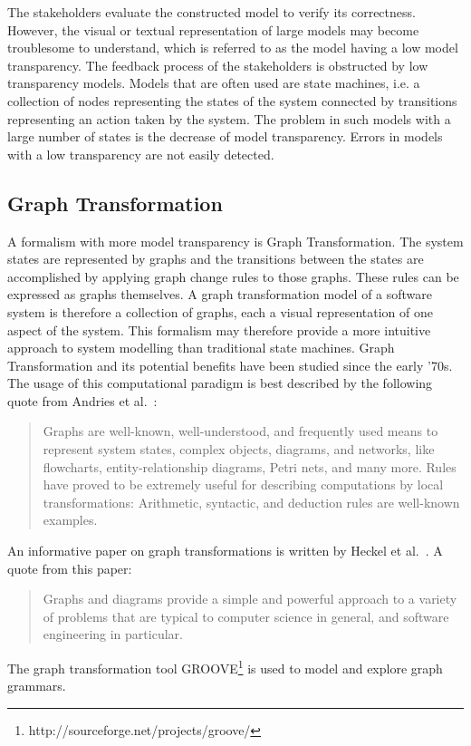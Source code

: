 The stakeholders evaluate the constructed model to verify its correctness. However, the visual or textual representation of large models may become troublesome to understand, which is referred to as the model having a low model transparency. The feedback process of the stakeholders is obstructed by low transparency models. Models that are often used are state machines, i.e. a collection of nodes representing the states of the system connected by transitions representing an action taken by the system. The problem in such models with a large number of states is the decrease of model transparency. Errors in models with a low transparency are not easily detected.

\subsection{Graph Transformation}
A formalism with more model transparency is Graph Transformation. The system states are represented by graphs and the transitions between the states are accomplished by applying graph change rules to those graphs. These rules can be expressed as graphs themselves. A graph transformation model of a software system is therefore a collection of graphs, each a visual representation of one aspect of the system. This formalism may therefore provide a more intuitive approach to system modelling than traditional state machines. Graph Transformation and its potential benefits have been studied since the early '70s. The usage of this computational paradigm is best described by the following quote from Andries et al.~\cite{Andries1999}: \begin{quote}Graphs are well-known, well-understood, and frequently used means to represent system states, complex objects, diagrams, and networks, like flowcharts, entity-relationship diagrams, Petri nets, and many more. Rules have proved to be extremely useful for describing computations by local transformations: Arithmetic, syntactic, and deduction rules are well-known examples.\end{quote} An informative paper on graph transformations is written by Heckel et al.~\cite{Heckel2006187}. A quote from this paper: \begin{quote}Graphs and diagrams provide a simple and powerful approach to a variety of problems that are typical to computer science in general, and software engineering in particular.\end{quote}

The graph transformation tool GROOVE\footnote{http://sourceforge.net/projects/groove/} is used to model and explore graph grammars.

